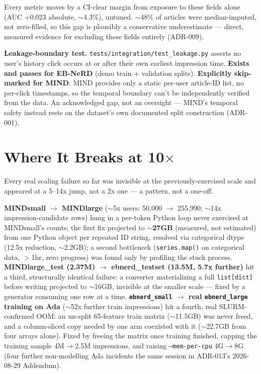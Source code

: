 \documentclass[10.5pt]{article}
\begin{document}
Every metric moves by a CI-clear margin from exposure to these fields
alone (AUC +0.023 absolute, $\sim$4.3\%), untuned. $\sim$48\% of articles
were median-imputed, not zero-filled, so this gap is plausibly a
conservative underestimate --- direct, measured evidence for excluding
these fields entirely (ADR-009).

\textbf{Leakage-boundary test.} \texttt{tests/integration/test\_leakage.py}
asserts no user's history click occurs at or after their own earliest
impression time. \textbf{Exists and passes for EB-NeRD} (demo train +
validation splits). \textbf{Explicitly skip-marked for MIND}: MIND
provides only a static per-user article-ID list, no per-click timestamps,
so the temporal boundary can't be independently verified from the data.
An acknowledged gap, not an oversight --- MIND's temporal safety instead
rests on the dataset's own documented split construction (ADR-001).

\section{Where It Breaks at 10$\times$}

Every real scaling failure so far was invisible at the previously-exercised
scale and appeared at a 5--14x jump, not a 2x one --- a pattern, not a
one-off.

\textbf{MINDsmall $\rightarrow$ MINDlarge} ($\sim$5x users: 50{,}000
$\rightarrow$ 255{,}990; $\sim$14x impression-candidate rows) hung in a
per-token Python loop never exercised at MINDsmall's counts; the first
fix projected to \textbf{$\sim$27GB} (measured, not estimated) from one
Python object per repeated ID string, resolved via categorical dtype
(12.5x reduction, $\sim$2.2GB); a second bottleneck
(\texttt{series.map()} on categorical data, $>$1hr, zero progress) was
found only by profiling the stuck process. \textbf{MINDlarge\_test (2.37M)
$\rightarrow$ ebnerd\_testset (13.5M, 5.7x further)} hit a third,
structurally identical failure: a converter materializing a full
\texttt{list[dict]} before writing projected to $\sim$16GB, invisible at
the smaller scale --- fixed by a generator consuming one row at a time.
\textbf{\texttt{ebnerd\_small} $\rightarrow$ real \texttt{ebnerd\_large}
training on Ada} ($\sim$52x further train impressions) hit a fourth,
real SLURM-confirmed OOM: an un-split 65-feature train matrix
($\sim$11.5GB) was never freed, and a column-sliced copy needed by one arm
coexisted with it ($\sim$22.7GB from four arrays alone). Fixed by freeing
the matrix once training finished, capping the training sample
4M$\to$2.5M impressions, and raising \texttt{--mem-per-cpu} 4G$\to$8G
(four further non-modelling Ada incidents the same session in ADR-013's
2026-08-29 Addendum).
\end{document}
